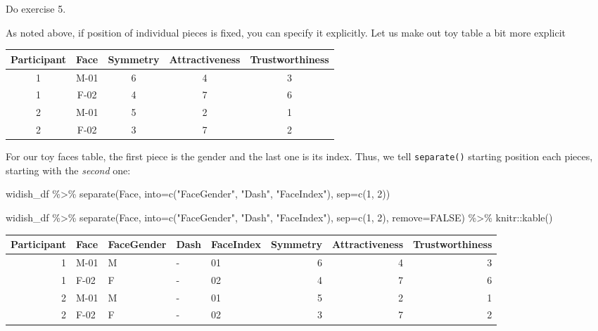 \documentclass[
]{book}
\newenvironment{Shaded}{\begin{snugshade}}{\end{snugshade}}
\newcommand{\AttributeTok}[1]{\textcolor[rgb]{0.77,0.63,0.00}{#1}}
\newcommand{\ConstantTok}[1]{\textcolor[rgb]{0.00,0.00,0.00}{#1}}
\newcommand{\DecValTok}[1]{\textcolor[rgb]{0.00,0.00,0.81}{#1}}
\newcommand{\FunctionTok}[1]{\textcolor[rgb]{0.00,0.00,0.00}{#1}}
\newcommand{\NormalTok}[1]{#1}
\newcommand{\SpecialCharTok}[1]{\textcolor[rgb]{0.00,0.00,0.00}{#1}}
\newcommand{\StringTok}[1]{\textcolor[rgb]{0.31,0.60,0.02}{#1}}
\begin{document}
Do exercise 5.

As noted above, if position of individual pieces is fixed, you can specify it explicitly. Let us make out toy table a bit more explicit

\begin{tabular}{c|c|c|c|c}
\hline
Participant & Face & Symmetry & Attractiveness & Trustworthiness\\
\hline
1 & M-01 & 6 & 4 & 3\\
\hline
1 & F-02 & 4 & 7 & 6\\
\hline
2 & M-01 & 5 & 2 & 1\\
\hline
2 & F-02 & 3 & 7 & 2\\
\hline
\end{tabular}

For our toy faces table, the first piece is the gender and the last one is its index. Thus, we tell \texttt{separate()} starting position each pieces, starting with the \emph{second} one:

\begin{Shaded}
\begin{Highlighting}[]
\NormalTok{widish\_df }\SpecialCharTok{\%\textgreater{}\%}
  \FunctionTok{separate}\NormalTok{(Face, }\AttributeTok{into=}\FunctionTok{c}\NormalTok{(}\StringTok{"FaceGender"}\NormalTok{, }\StringTok{"Dash"}\NormalTok{, }\StringTok{"FaceIndex"}\NormalTok{), }\AttributeTok{sep=}\FunctionTok{c}\NormalTok{(}\DecValTok{1}\NormalTok{, }\DecValTok{2}\NormalTok{))}
\end{Highlighting}
\end{Shaded}

\begin{Shaded}
\begin{Highlighting}[]
\NormalTok{widish\_df }\SpecialCharTok{\%\textgreater{}\%}
  \FunctionTok{separate}\NormalTok{(Face, }\AttributeTok{into=}\FunctionTok{c}\NormalTok{(}\StringTok{"FaceGender"}\NormalTok{, }\StringTok{"Dash"}\NormalTok{, }\StringTok{"FaceIndex"}\NormalTok{), }\AttributeTok{sep=}\FunctionTok{c}\NormalTok{(}\DecValTok{1}\NormalTok{, }\DecValTok{2}\NormalTok{), }\AttributeTok{remove=}\ConstantTok{FALSE}\NormalTok{) }\SpecialCharTok{\%\textgreater{}\%}
\NormalTok{  knitr}\SpecialCharTok{::}\FunctionTok{kable}\NormalTok{()}
\end{Highlighting}
\end{Shaded}

\begin{tabular}{r|l|l|l|l|r|r|r}
\hline
Participant & Face & FaceGender & Dash & FaceIndex & Symmetry & Attractiveness & Trustworthiness\\
\hline
1 & M-01 & M & - & 01 & 6 & 4 & 3\\
\hline
1 & F-02 & F & - & 02 & 4 & 7 & 6\\
\hline
2 & M-01 & M & - & 01 & 5 & 2 & 1\\
\hline
2 & F-02 & F & - & 02 & 3 & 7 & 2\\
\hline
\end{tabular}
\end{document}
